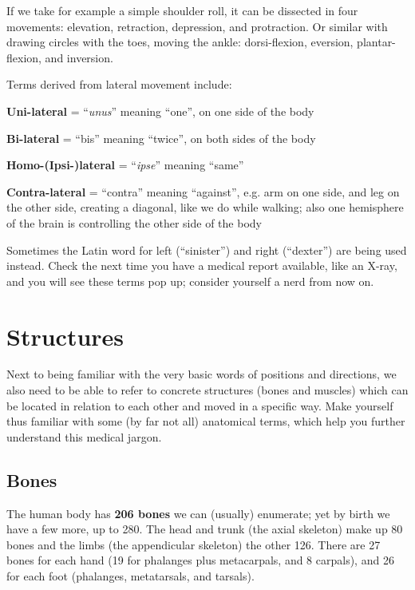 If we take for example a simple shoulder roll, it can be dissected in four movements: elevation, retraction, depression, and protraction.
Or similar with drawing circles with the toes, moving the ankle: dorsi-flexion, eversion, plantar-flexion, and inversion.

Terms derived from lateral movement include:

\begin{itemize*}
    \item \textbf{Uni-lateral} = ``\textit{unus}'' meaning ``one'', on one side of the body
    \item \textbf{Bi-lateral} = ``bis'' meaning ``twice'', on both sides of the body
    \item \textbf{Homo-(Ipsi-)lateral} = ``\textit{ipse}'' meaning ``same''
    \item \textbf{Contra-lateral} = ``contra'' meaning ``against'', e.g. arm on one side, and leg on the other side, creating a diagonal, like we do while walking; also one hemisphere of the brain is controlling the other side of the body
\end{itemize*}

Sometimes the Latin word for left (``sinister'') and right (``dexter'') are being used instead.
Check the next time you have a medical report available, like an X-ray, and you will see these terms pop up; consider yourself a nerd from now on.

\section{Structures}\label{sec:structures}

Next to being familiar with the very basic words of positions and directions, we also need to be able to refer to concrete structures (bones and muscles) which can be located in relation to each other and moved in a specific way.
Make yourself thus familiar with some (by far not all) anatomical terms, which help you further understand this medical jargon.

\subsection{Bones}\label{subsec:bones}

The human body has \textbf{206 bones} we can (usually) enumerate; yet by birth we have a few more, up to 280.
The head and trunk (the axial skeleton) make up 80 bones and the limbs (the appendicular skeleton) the other 126.
There are 27 bones for each hand (19 for phalanges plus metacarpals, and 8 carpals), and 26 for each foot (phalanges, metatarsals, and tarsals).

